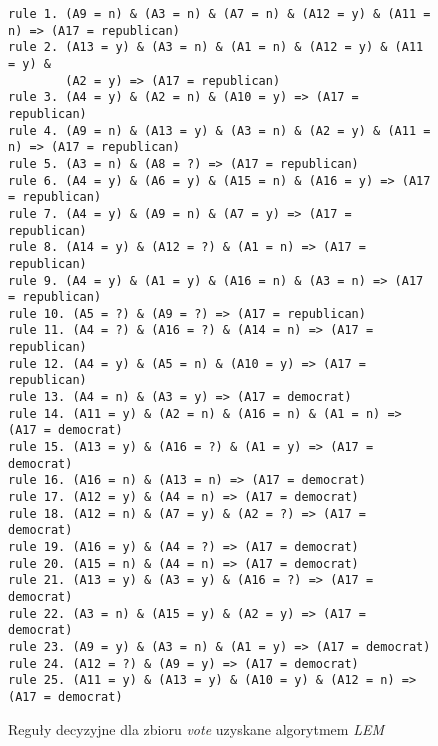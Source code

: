 \begin{figure}
\begin{verbatim}
rule 1. (A9 = n) & (A3 = n) & (A7 = n) & (A12 = y) & (A11 = n) => (A17 = republican)
rule 2. (A13 = y) & (A3 = n) & (A1 = n) & (A12 = y) & (A11 = y) &
        (A2 = y) => (A17 = republican)
rule 3. (A4 = y) & (A2 = n) & (A10 = y) => (A17 = republican)
rule 4. (A9 = n) & (A13 = y) & (A3 = n) & (A2 = y) & (A11 = n) => (A17 = republican)
rule 5. (A3 = n) & (A8 = ?) => (A17 = republican)
rule 6. (A4 = y) & (A6 = y) & (A15 = n) & (A16 = y) => (A17 = republican)
rule 7. (A4 = y) & (A9 = n) & (A7 = y) => (A17 = republican)
rule 8. (A14 = y) & (A12 = ?) & (A1 = n) => (A17 = republican)
rule 9. (A4 = y) & (A1 = y) & (A16 = n) & (A3 = n) => (A17 = republican)
rule 10. (A5 = ?) & (A9 = ?) => (A17 = republican)
rule 11. (A4 = ?) & (A16 = ?) & (A14 = n) => (A17 = republican)
rule 12. (A4 = y) & (A5 = n) & (A10 = y) => (A17 = republican)
rule 13. (A4 = n) & (A3 = y) => (A17 = democrat)
rule 14. (A11 = y) & (A2 = n) & (A16 = n) & (A1 = n) => (A17 = democrat)
rule 15. (A13 = y) & (A16 = ?) & (A1 = y) => (A17 = democrat)
rule 16. (A16 = n) & (A13 = n) => (A17 = democrat)
rule 17. (A12 = y) & (A4 = n) => (A17 = democrat)
rule 18. (A12 = n) & (A7 = y) & (A2 = ?) => (A17 = democrat)
rule 19. (A16 = y) & (A4 = ?) => (A17 = democrat)
rule 20. (A15 = n) & (A4 = n) => (A17 = democrat)
rule 21. (A13 = y) & (A3 = y) & (A16 = ?) => (A17 = democrat)
rule 22. (A3 = n) & (A15 = y) & (A2 = y) => (A17 = democrat)
rule 23. (A9 = y) & (A3 = n) & (A1 = y) => (A17 = democrat)
rule 24. (A12 = ?) & (A9 = y) => (A17 = democrat)
rule 25. (A11 = y) & (A13 = y) & (A10 = y) & (A12 = n) => (A17 = democrat)
\end{verbatim}
\caption{Reguły decyzyjne dla zbioru \emph{vote} uzyskane algorytmem \emph{LEM}}
\label{p2t2-vote-rules}
\end{figure}
